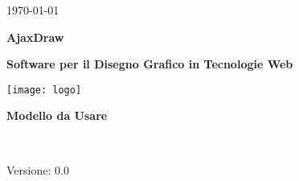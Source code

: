 
\title{\TITOLODOC}
\author{Piero Bizzotto}



\renewcommand{\insertversion}{0.0} %
\renewcommand{\TITOLODOC}{Modello da Usare} %
\renewcommand{\glosspath}{.\glossario} %

\begin{titlepage}
\begin{center}
	\begin{Large}	\today \end{Large}
\end{center}

\vspace{20pt}

\begin{center}
	\begin{Huge}
				\textbf{AjaxDraw}
	\end{Huge}
\end{center}			

\begin{center}
	\begin{large}
				\textbf{Software per il Disegno Grafico in Tecnologie Web}
	\end{large}
\end{center}			

\vspace{20pt}

\begin{center}
\texttt{[image: logo]}
\end{center}

\vspace{170pt}
\begin{center} %
	\begin{Huge}
				\textbf{\TITOLODOC}
	\end{Huge}
			\\
\end{center}
\vspace{210pt}
\begin{center}
Versione: \insertversion
\end{center}
\end{titlepage}

\newpage

